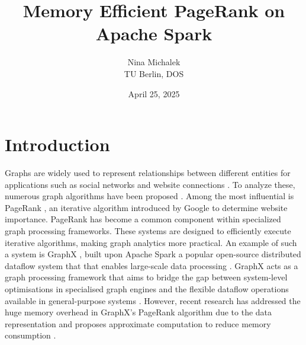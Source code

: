 \documentclass[a4paper,12pt]{article}
\title{Memory Efficient PageRank on Apache Spark}
\author{Nina Michalek\\TU Berlin, DOS}
\date{April 25, 2025}
\begin{document}
\maketitle


\section{Introduction}
 Graphs are widely used to represent relationships between different entities for applications such as social networks and website connections \cite{zhang_distributed_2021}. 
To analyze these, numerous graph algorithms have been proposed \cite{malewicz_pregel_2010}\cite{low_distributed_2012}\cite{koch_empirical_2016}. Among the most influential is PageRank \cite{page_pagerank_1999}, an iterative algorithm introduced by Google to determine website importance. PageRank has become a common component within specialized graph processing frameworks. These systems are designed to efficiently execute iterative algorithms, making graph analytics more practical. An example of such a system is GraphX \cite{xin_graphx_2013}, built upon Apache Spark \cite{xin_graphx_2013} a popular open-source distributed dataflow system that that enables large-scale data processing \cite{shanahan_large_2015}. GraphX acts as a graph processing framework that aims to bridge the gap between system-level optimisations in specialised graph engines and the flexible dataflow operations available in general-purpose systems \cite{jin_software_2022}. However, recent research has addressed the huge memory overhead in GraphX's PageRank algorithm due to the data representation and proposes approximate computation to reduce memory consumption \cite{wu_efficient_2024}. 
 
\end{document}

